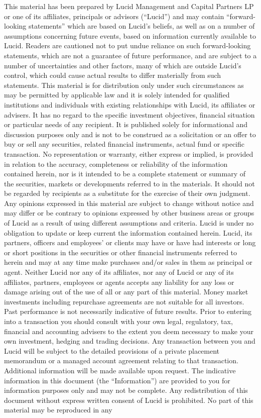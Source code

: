\documentclass[9pt]{article}
\begin{document}
    \noindent This material has been prepared by Lucid Management and Capital Partners LP or one of its affiliates, principals or advisors (``Lucid'') and may contain ``forward-looking statements'' which are based on Lucid's beliefs, as well as on a number of assumptions concerning future events, based on information currently available to Lucid. Readers are cautioned not to put undue reliance on such forward-looking statements, which are not a guarantee of future performance, and are subject to a number of uncertainties and other factors, many of which are outside Lucid's control, which could cause actual results to differ materially from such statements. This material is for distribution only under such circumstances as may be permitted by applicable law and it is solely intended for qualified institutions and individuals with existing relationships with Lucid, its affiliates or advisers.  It has no regard to the specific investment objectives, financial situation or particular needs of any recipient. It is published solely for informational and discussion purposes only and is not to be construed as a solicitation or an offer to buy or sell any securities, related financial instruments, actual fund or specific transaction. No representation or warranty, either express or implied, is provided in relation to the accuracy, completeness or reliability of the information contained herein, nor is it intended to be a complete statement or summary of the securities, markets or developments referred to in the materials.  It should not be regarded by recipients as a substitute for the exercise of their own judgment. Any opinions expressed in this material are subject to change without notice and may differ or be contrary to opinions expressed by other business areas or groups of Lucid as a result of using different assumptions and criteria. Lucid is under no obligation to update or keep current the information contained herein. Lucid, its partners, officers and employees' or clients may have or have had interests or long or short positions in the securities or other financial instruments referred to herein and may at any time make purchases and/or sales in them as principal or agent. Neither Lucid nor any of its affiliates, nor any of Lucid or any of its affiliates, partners, employees or agents accepts any liability for any loss or damage arising out of the use of all or any part of this material. Money market investments including repurchase agreements are not suitable for all investors. Past performance is not necessarily indicative of future results.  Prior to entering into a transaction you should consult with your own legal, regulatory, tax, financial and accounting advisers to the extent you deem necessary to make your own investment, hedging and trading decisions. Any transaction between you and Lucid will be subject to the detailed provisions of a private placement memorandum or a managed account agreement relating to that transaction. Additional information will be made available upon request. The indicative information in this document (the ``Information'') are provided to you for information purposes only and may not be complete. Any redistribution of this document without express written consent of Lucid is prohibited.  No part of this material may be reproduced in any 
\end{document}
